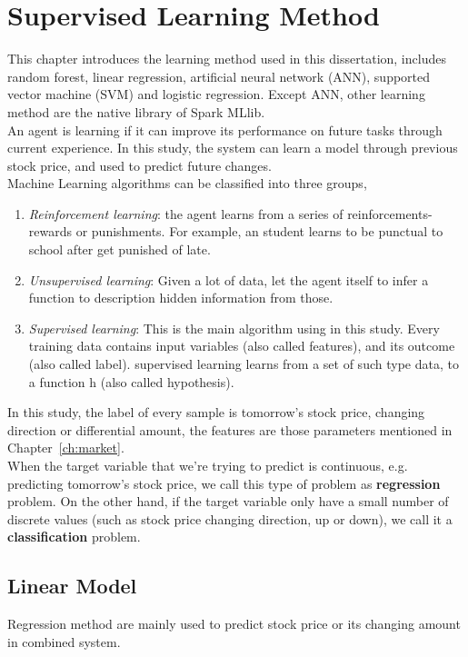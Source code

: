 \section{Supervised Learning Method}

This chapter introduces the learning method used in this dissertation, includes random forest, linear regression, artificial neural network (ANN), supported vector machine (SVM) and logistic regression. Except ANN, other learning method are the native library of Spark MLlib.\\


An agent is learning if it can improve its performance on future tasks through current experience\cite{russell2003artificial}. In this study, the system can learn a model through previous stock price, and used to predict future changes.\\


Machine Learning algorithms can be classified into three groups\cite{russell2003artificial}, 
\begin{enumerate}
	\item \textit{Reinforcement learning}: the agent learns from a series of reinforcements-rewards or punishments. For example, an student learns to be punctual to school after get punished of late.
	\item \textit{Unsupervised learning}: Given a lot of data, let the agent itself to infer a function to description hidden information from those.
	\item \textit{Supervised learning}: This is the main algorithm using in this study. Every training data contains input variables (also called features), and its outcome (also called label). supervised learning learns from a set of such type data, to a function h (also called hypothesis).
\end{enumerate}


In this study, the label of every sample is tomorrow's stock price, changing direction or differential amount, the features are those parameters mentioned in Chapter~\ref{ch:market}.\\


When the target variable that we're trying to predict is continuous, e.g. predicting tomorrow's stock price, we call this type of problem as \textbf{regression} problem. On the other hand, if the target variable only have a small number of discrete values (such as stock price changing direction, up or down), we call it a \textbf{classification} problem.


\subsection{Linear Model}
Regression method are mainly used to predict stock price or its changing amount in combined system.

